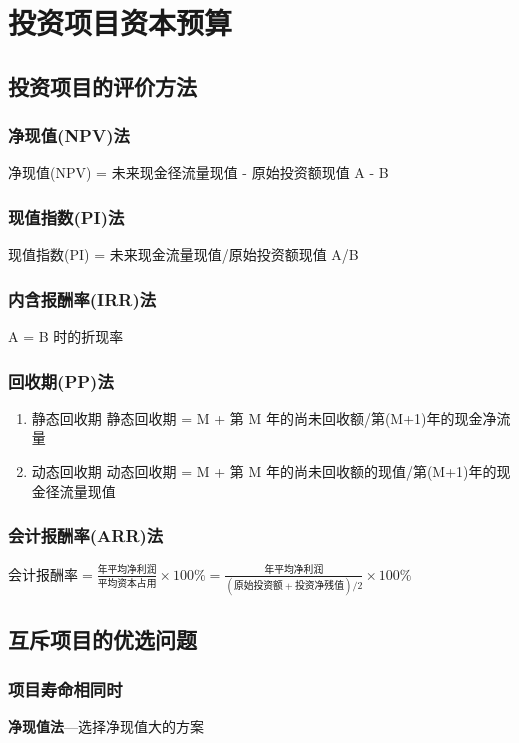 \documentclass[11pt]{article}
\begin{document}
\section{投资项目资本预算}
\label{sec:org8e0a351}
\subsection{投资项目的评价方法}
\label{sec:org1cad9c4}
\subsubsection{净现值(NPV)法}
\label{sec:org51c338b}
净现值(NPV) = 未来现金径流量现值 - 原始投资额现值
A - B
\subsubsection{现值指数(PI)法}
\label{sec:orga396106}
现值指数(PI) = 未来现金流量现值/原始投资额现值
A/B
\subsubsection{内含报酬率(IRR)法}
\label{sec:org8e4d300}
A = B 时的折现率
\subsubsection{回收期(PP)法}
\label{sec:orgcaed45d}
\begin{enumerate}
\item 静态回收期
\label{sec:orgb43cc61}
静态回收期 = M + 第 M 年的尚未回收额/第(M+1)年的现金净流量
\item 动态回收期
\label{sec:orgfb5a1bc}
动态回收期 = M + 第 M 年的尚未回收额的现值/第(M+1)年的现金径流量现值
\end{enumerate}
\subsubsection{会计报酬率(ARR)法}
\label{sec:orgf51a481}
\(会计报酬率 = \frac{年平均净利润}{平均资本占用}\times 100\% = \frac{年平均净利润}{(原始投资额+投资净残值)/2}\times 100\%\)
\subsection{互斥项目的优选问题}
\label{sec:org93e519d}
\subsubsection{项目寿命相同时}
\label{sec:org95efe16}
\textbf{净现值法}---选择净现值大的方案
\end{document}
